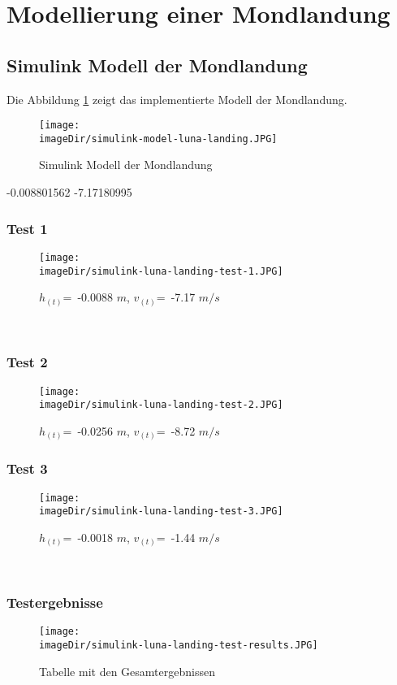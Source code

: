 \section{Modellierung einer Mondlandung}
\label{sec:modeling-luna-landing}

\subsection{Simulink Modell der Mondlandung}
\label{sec:sub-simulink-model-luna-landing}
Die Abbildung \ref{fig:simulink-model-luna-landing} zeigt das implementierte Modell der Mondlandung.
\begin{figure}[h]
	\centering
	\texttt{[image: \\imageDir/simulink-model-luna-landing.JPG]}
	\caption{Simulink Modell der Mondlandung}
	\label{fig:simulink-model-luna-landing}
\end{figure}
-0.008801562	-7.17180995

\subsubsection{Test 1}
\begin{figure}[h]
	\centering
	\texttt{[image: \\imageDir/simulink-luna-landing-test-1.JPG]}
	\caption{$h_{(t)}$=~-0.0088 $m$, $v_{(t)}$=~-7.17 $m/s$}
	\label{fig:simulink-luna-landing-test-1}
\end{figure}
\ \newpage

\subsubsection{Test 2}
\begin{figure}[h]
	\centering
	\texttt{[image: \\imageDir/simulink-luna-landing-test-2.JPG]}
	\caption{$h_{(t)}$=~-0.0256 $m$, $v_{(t)}$=~-8.72 $m/s$}
	\label{fig:simulink-luna-landing-test-2}
\end{figure}

\subsubsection{Test 3}
\begin{figure}[h]
	\centering
	\texttt{[image: \\imageDir/simulink-luna-landing-test-3.JPG]}
	\caption{$h_{(t)}$=~-0.0018 $m$, $v_{(t)}$=~-1.44 $m/s$}
	\label{fig:simulink-luna-landing-test-3}
\end{figure}
\ \newpage

\subsubsection{Testergebnisse}
\label{sec:simulink-luna-landing-test-results}
\begin{figure}[h]
	\centering
	\texttt{[image: \\imageDir/simulink-luna-landing-test-results.JPG]}
	\caption{Tabelle mit den Gesamtergebnissen}
	\label{fig:simulink-luna-landing-test-result}
\end{figure}


